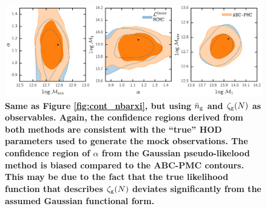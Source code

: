 \documentclass[fleqn,usenatbib]{mnras}
\begin{document}
\begin{figure}
\includegraphics[width=1.\textwidth]{figs/paper_ABCvsMCMC_contour_nbargmf.pdf}
\caption{\label{fig:cont_nbargmf} 
{\bf \color{dred}
Same as Figure \ref{fig:cont_nbarxi}, but using $\bar{n}_{\mathrm{g}}$ and $\mathcal{\zeta}_{\rm g}(N)$ as 
observables. Again, the confidence regions derived from both methods are 
consistent with the ``true'' HOD parameters used to generate the mock 
observations. The confidence region of $\alpha$ from the Gaussian 
pseudo-likelood method is biased compared to the ABC-PMC contours. 
This may be due to the fact that the true likelihood function that 
describes $\mathcal{\zeta}_{\rm g}(N)$ deviates significantly from the assumed Gaussian 
functional form.}}
\end{figure}




\label{lastpage}
\end{document}
